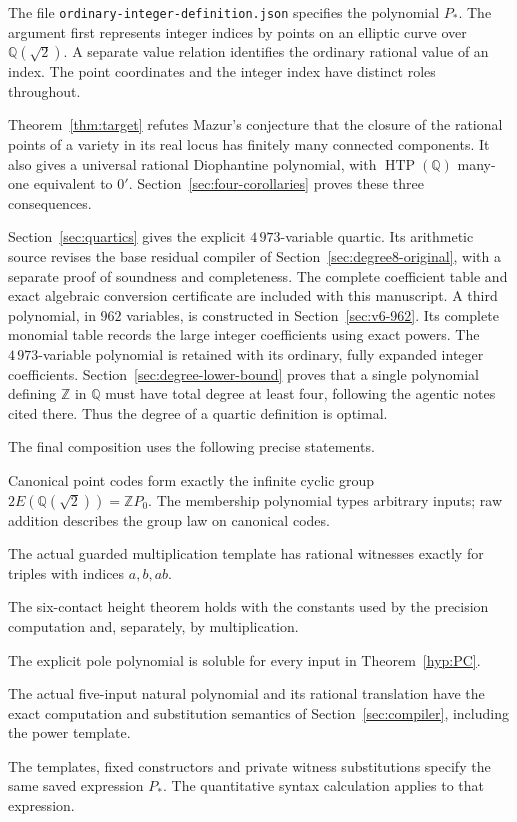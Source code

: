 \documentclass[11pt]{article}
\theoremstyle{definition}
\theoremstyle{remark}
\newcommand{\Q}{\mathbb Q}
\newcommand{\Z}{\mathbb Z}
\begin{document}
The file \nolinkurl{ordinary-integer-definition.json} specifies the
polynomial $P_*$. The argument first represents integer indices by points
on an elliptic curve over $\Q(\sqrt2)$. A separate value relation identifies
the ordinary rational value of an index. The point coordinates and the
integer index have distinct roles throughout.

Theorem~\ref{thm:target} refutes Mazur's conjecture that the closure of
the rational points of a variety in its real locus has finitely many
connected components. It also gives a universal rational Diophantine
polynomial, with
$\operatorname{HTP}(\Q)$ many-one equivalent to $0'$.
Section~\ref{sec:four-corollaries} proves these three consequences.

Section~\ref{sec:quartics} gives the explicit $4\,973$-variable quartic.
Its arithmetic source revises the base residual compiler of
Section~\ref{sec:degree8-original}, with a separate proof of soundness and
completeness. The complete coefficient table and exact algebraic conversion
certificate are included with this manuscript.
A third polynomial, in $962$ variables, is constructed in
Section~\ref{sec:v6-962}. Its complete monomial table records the large
integer coefficients using exact powers. The $4\,973$-variable polynomial
is retained with its ordinary, fully expanded integer coefficients.
Section~\ref{sec:degree-lower-bound} proves that a single polynomial
defining $\Z$ in $\Q$ must have total degree at least four, following
the agentic notes cited there. Thus the degree of a quartic definition is optimal.

The final composition uses the following precise statements.
\begin{description}[style=nextline,leftmargin=1.8cm]
\item[$\mathsf G$] Canonical point codes form exactly the infinite cyclic
group $2E(\Q(\sqrt2))=\Z P_0$. The membership polynomial types arbitrary inputs;
raw addition describes the group law on canonical codes.
\item[$\mathsf M$] The actual guarded multiplication template has rational
witnesses exactly for triples with indices $a,b,ab$.
\item[$\mathsf H$] The six-contact height theorem holds with the constants
used by the precision computation and, separately, by multiplication.
\item[$\mathsf{PC}$] The explicit pole polynomial is soluble for every
input in Theorem~\ref{hyp:PC}.
\item[$\mathsf C$] The actual five-input natural polynomial and its
rational translation have the exact computation and substitution semantics
of Section~\ref{sec:compiler}, including the power template.
\item[$\mathsf B$] The templates, fixed constructors and private witness
substitutions specify the same saved expression $P_*$. The quantitative
syntax calculation applies to that expression.
\end{description}
\end{document}
